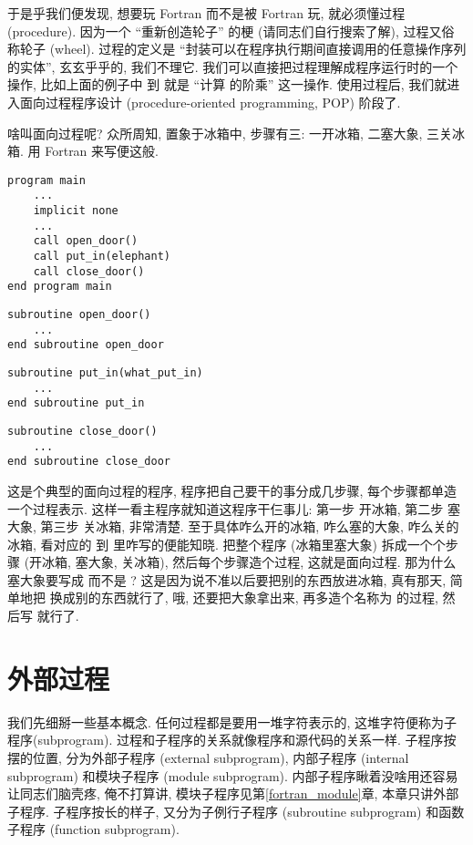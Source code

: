 于是乎我们便发现, 想要玩 Fortran 而不是被 Fortran 玩, 就必须懂过程 (procedure). 因为一个 ``重新创造轮子'' 的梗 (请同志们自行搜索了解), 过程又俗称轮子 (wheel). 过程的定义是 ``封装可以在程序执行期间直接调用的任意操作序列的实体'', 玄玄乎乎的, 我们不理它. 我们可以直接把过程理解成程序运行时的一个操作, 比如上面的例子中  到  就是 ``计算  的阶乘'' 这一操作. 使用过程后, 我们就进入面向过程程序设计 (procedure-oriented programming, POP) 阶段了.

啥叫面向过程呢? 众所周知, 置象于冰箱中, 步骤有三: 一开冰箱, 二塞大象, 三关冰箱. 用 Fortran 来写便这般. 
\begin{lstlisting}[numbers=none] 
program main
    ... 
    implicit none
    ... 
    call open_door()
    call put_in(elephant)
    call close_door()
end program main
\end{lstlisting}
\begin{lstlisting}[numbers=none]
subroutine open_door()
    ... 
end subroutine open_door
\end{lstlisting}
\begin{lstlisting}[numbers=none]
subroutine put_in(what_put_in)
    ... 
end subroutine put_in
\end{lstlisting}
\begin{lstlisting}[numbers=none]
subroutine close_door()
    ... 
end subroutine close_door
\end{lstlisting} 
这是个典型的面向过程的程序, 程序把自己要干的事分成几步骤, 每个步骤都单造一个过程表示. 这样一看主程序就知道这程序干仨事儿: 第一步  开冰箱, 第二步  塞大象, 第三步  关冰箱, 非常清楚. 至于具体咋么开的冰箱, 咋么塞的大象, 咋么关的冰箱, 看对应的  到  里咋写的便能知晓. 把整个程序 (冰箱里塞大象) 拆成一个个步骤 (开冰箱, 塞大象, 关冰箱), 然后每个步骤造个过程, 这就是面向过程. 那为什么塞大象要写成  而不是 ? 这是因为说不准以后要把别的东西放进冰箱, 真有那天, 简单地把  换成别的东西就行了, 哦, 还要把大象拿出来, 再多造个名称为  的过程, 然后写  就行了.

\section{外部过程} 

我们先细掰一些基本概念. 任何过程都是要用一堆字符表示的, 这堆字符便称为子程序(subprogram). 过程和子程序的关系就像程序和源代码的关系一样. 子程序按摆的位置, 分为外部子程序 (external subprogram), 内部子程序 (internal subprogram) 和模块子程序 (module subprogram). 内部子程序瞅着没啥用还容易让同志们脑壳疼, 俺不打算讲, 模块子程序见第\ref{fortran_module}章, 本章只讲外部子程序. 子程序按长的样子, 又分为子例行子程序 (subroutine subprogram) 和函数子程序 (function subprogram). 

